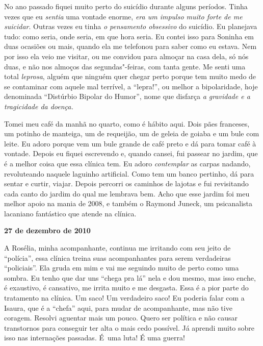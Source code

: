 No ano passado fiquei muito perto do suicídio durante alguns períodos.
Tinha vezes que eu \emph{sentia} uma vontade enorme, \emph{era um
impulso muito forte de me suicidar}. Outras vezes eu tinha \emph{o
pensamento obsessivo}\textbf{} do suicídio. Eu planejava tudo: como
seria, onde seria, em que hora seria. Eu contei isso para Soninha em
duas ocasiões ou mais, quando ela me telefonou para saber como eu
estava. Nem por isso ela veio me visitar, ou me convidou para almoçar na
casa dela, só nós duas, e não nos almoços das segundas"-feiras, com tanta
gente. Me senti uma total \emph{leprosa}, alguém que ninguém quer chegar
perto porque tem muito medo de se contaminar com aquele mal terrível, a
``lepra!'', ou melhor a bipolaridade, hoje denominada ``Distúrbio
Bipolar do Humor'', nome que disfarça \emph{a gravidade e a tragicidade
da doença.}

Tomei meu café da manhã no quarto, como é hábito aqui. Dois pães
franceses, um potinho de manteiga, um de requeijão, um de geleia de
goiaba e um bule com leite. Eu adoro porque vem um bule grande de café
preto e dá para tomar café à vontade. Depois eu fiquei escrevendo e,
quando cansei, fui passear no jardim, que é a melhor coisa que essa
clínica tem. Eu adoro \emph{contemplar} as carpas nadando, revoluteando
naquele laguinho artificial. Como tem um banco pertinho, dá para sentar
e curtir, viajar. Depois percorri os caminhos de lajotas e fui
revisitando cada canto do jardim do qual me lembrava bem. Acho que esse
jardim foi meu melhor apoio na mania de 2008, e também o Raymond Juneck,
um psicanalista lacaniano fantástico que atende na clínica.

\begin{flushright}\textbf{27 de dezembro de 2010}\end{flushright}


A Rosélia, minha acompanhante, continua me irritando com seu jeito de
``polícia'', essa clínica treina suas acompanhantes para serem
verdadeiras ``policiais''. Ela gruda em mim e vai me seguindo muito de
perto como uma sombra. Eu tenho que dar uns ``chega pra lá'' nela e dou
mesmo, mas isso enche, é exaustivo, é cansativo, me irrita muito e me
desgasta. Essa é a pior parte do tratamento na clínica. Um saco! Um
verdadeiro saco! Eu poderia falar com a Isaura, que é a ``chefa'' aqui,
para mudar de acompanhante, mas não tive coragem. Resolvi aguentar mais
um pouco. Quero ser política e não causar transtornos para conseguir ter
alta o mais cedo possível. Já aprendi muito sobre isso nas internações
passadas. É~uma luta! É uma guerra!

